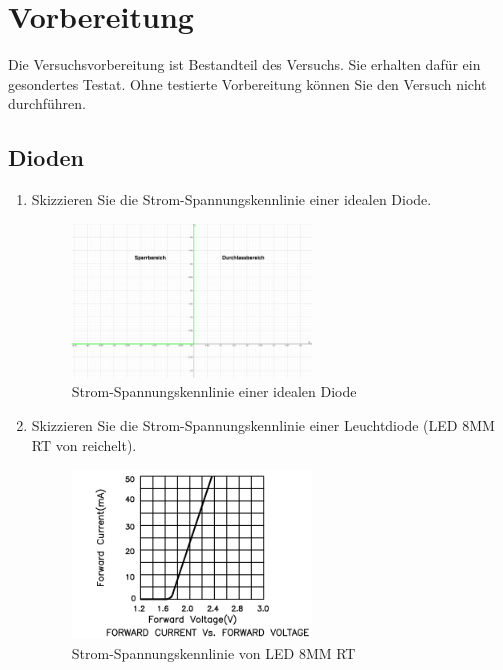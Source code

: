 \section{Vorbereitung}
Die Versuchsvorbereitung ist Bestandteil des Versuchs. Sie erhalten dafür ein gesondertes Testat. Ohne
testierte Vorbereitung können Sie den Versuch nicht durchführen.
\subsection{Dioden}
\begin{enumerate}[label=\alph*)]
	\item Skizzieren Sie die Strom-Spannungskennlinie einer idealen Diode.
    \begin{figure}[h!]
      \begin{center}
        \includegraphics[width=0.6\textwidth]{img/2.1.1.1}
      \end{center}
      \caption{Strom-Spannungskennlinie einer idealen Diode}\label{img:2.1.1.1}
    \end{figure}
    
	\item Skizzieren Sie die Strom-Spannungskennlinie einer Leuchtdiode (LED 8MM RT von reichelt).
    \begin{figure}[h!]
      \begin{center}
        \includegraphics[width=0.6\textwidth]{img/2.1.2.1}
      \end{center}
      \caption{Strom-Spannungskennlinie von LED 8MM RT}\label{img:2.1.2.1}
    \end{figure}
    

\end{enumerate}
